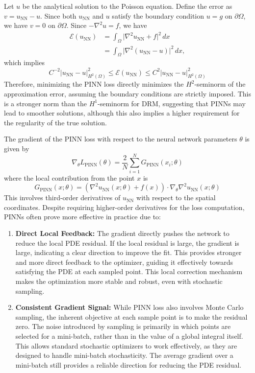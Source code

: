\documentclass{article}
\begin{document}
Let $u$ be the analytical solution to the Poisson equation.
Define the error as $v = u_{\text{NN}} - u$. Since both $u_{\text{NN}}$ and $u$ satisfy the boundary condition $u=g$ on $\partial\Omega$, we have $v=0$ on $\partial\Omega$.
Since $-\nabla^2 u = f$, we have
\begin{align*}
\mathcal{E}(u_{\text{NN}}) &= \int_{\Omega} \vert \nabla^2 u_{\text{NN}} + f \vert^2 \, dx \\
& = \int_{\Omega} \vert \nabla^2 (u_{\text{NN}} - u) \vert^2 \, dx,
\end{align*}
which implies
$$ C^{-2} \vert u_{\text{NN}} - u \vert_{H^2(\Omega)}^2 \leq \mathcal{E}(u_{\text{NN}}) \leq C^2 \vert u_{\text{NN}} - u \vert_{H^2(\Omega)}^2 $$
Therefore, minimizing the PINN loss directly minimizes the $H^2$-seminorm of the approximation error, assuming the boundary conditions are strictly imposed. This is a stronger norm than the $H^1$-seminorm for DRM, suggesting that PINNs may lead to smoother solutions, although this also implies a higher requirement for the regularity of the true solution.

The gradient of the PINN loss with respect to the neural network parameters $\theta$ is given by
$$ \nabla_{\theta} L_{\text{PINN}}(\theta) = \frac{2}{N} \sum_{i=1}^N G_{\text{PINN}}(x_i; \theta)$$
where the local contribution from the point $x$ is
\begin{equation}
G_{\text{PINN}}(x; \theta) = \left( \nabla^2 u_{\text{NN}}(x; \theta) + f(x) \right) \cdot \nabla_{\theta} \nabla^2 u_{\text{NN}}(x; \theta)
\end{equation}
This involves third-order derivatives of $u_{\text{NN}}$ with respect to the spatial coordinates.
Despite requiring higher-order derivatives for the loss computation, PINNs often prove more effective in practice due to:
\begin{enumerate}
\item \textbf{Direct Local Feedback:} The gradient directly pushes the network to reduce the local PDE residual. If the local residual is large, the gradient is large, indicating a clear direction to improve the fit. This provides stronger and more direct feedback to the optimizer, guiding it effectively towards satisfying the PDE at each sampled point. This local correction mechanism makes the optimization more stable and robust, even with stochastic sampling.
\item \textbf{Consistent Gradient Signal:} While PINN loss also involves Monte Carlo sampling, the inherent objective at each sample point is to make the residual zero. The noise introduced by sampling is primarily in which points are selected for a mini-batch, rather than in the value of a global integral itself. This allows standard stochastic optimizers to work effectively, as they are designed to handle mini-batch stochasticity. The average gradient over a mini-batch still provides a reliable direction for reducing the PDE residual.
\end{enumerate}
\end{document}
